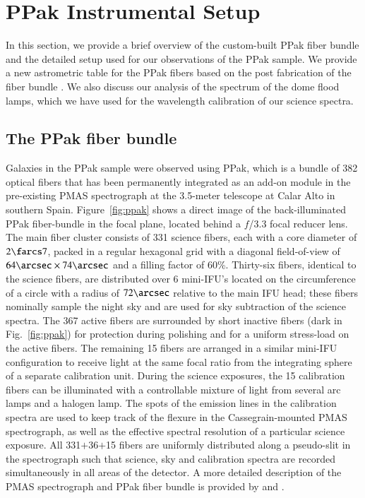 \documentclass[traditabstract]{aa} %
\begin{document}
\section{PPak Instrumental Setup}
\label{sec:Setup}

In this section, we provide a brief overview of the custom-built PPak fiber
bundle and the detailed setup used for our observations of the PPak sample.  We provide
a new astrometric table for the PPak fibers based on the post fabrication of the fiber
bundle \citep[as opposed to the nominal positions provided by][]{kelz2006}.  We
also discuss our analysis of the spectrum of the dome flood lamps, which we have
used for the wavelength calibration of our science spectra.


\subsection{The PPak fiber bundle}

Galaxies in the PPak sample were observed using PPak, which is a bundle of 382
optical fibers that has been permanently integrated as an add-on module in the
pre-existing PMAS spectrograph at the 3.5-meter telescope at Calar Alto in
southern Spain.  Figure~\ref{fig:ppak} shows a direct image of the
back-illuminated PPak fiber-bundle in the focal plane, located behind a $f$/3.3
focal reducer lens.  The main fiber cluster consists of 331 science fibers, each
with a core diameter of $2\farcs7$, packed in a regular hexagonal grid with a
diagonal field-of-view of $64\arcsec\times74\arcsec$ and a filling factor of
60\%.  Thirty-six fibers, identical to the science fibers, are distributed over
6 mini-IFU's located on the circumference of a circle with a radius of
$72\arcsec$ relative to the main IFU head; these fibers nominally sample the
night sky and are used for sky subtraction of the science spectra.  The 367
active fibers are surrounded by short inactive fibers (dark in
Fig.~\ref{fig:ppak}) for protection during polishing and for a uniform
stress-load on the active fibers.  The remaining 15 fibers are arranged in a
similar mini-IFU configuration to receive light at the same focal ratio from the
integrating sphere of a separate calibration unit.  During the science
exposures, the 15 calibration fibers can be illuminated with a controllable
mixture of light from several arc lamps and a halogen lamp. The spots of the
emission lines in the calibration spectra are used to keep track of the flexure
in the Cassegrain-mounted PMAS spectrograph, as well as the effective spectral
resolution of a particular science exposure.  All 331$+$36$+$15 fibers are
uniformly distributed along a pseudo-slit in the spectrograph such that science,
sky and calibration spectra are recorded simultaneously in all areas of the
detector. A more detailed description of the PMAS spectrograph and PPak fiber
bundle is provided by \citet{roth2005} and \citet{kelz2006}.
\end{document}
